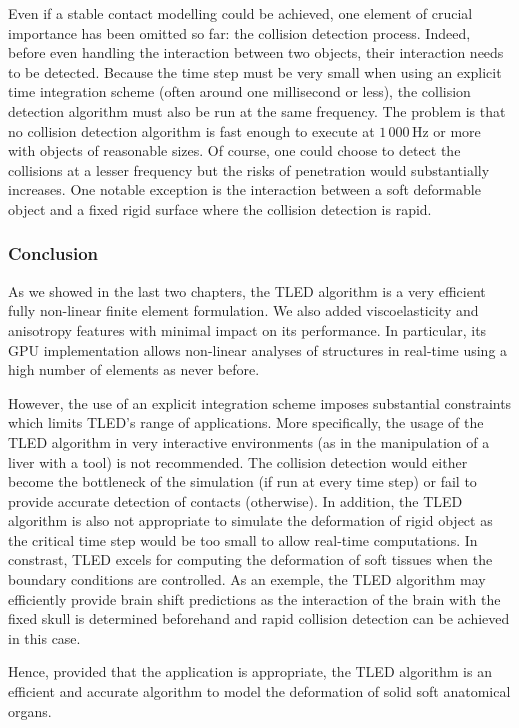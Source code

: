 \ON
Even if a stable contact modelling could be achieved, one element of crucial importance has been omitted so far: the collision detection process. Indeed, before even handling the interaction between two objects, their interaction needs to be detected. Because the time step must be very small when using an explicit time integration scheme (often around one millisecond or less), the collision detection algorithm must also be run at the same frequency. The problem is that no collision detection algorithm is fast enough to execute at $ 1\,000\,$Hz or more with objects of reasonable sizes. Of course, one could choose to detect the collisions at a lesser frequency but the risks of penetration would substantially increases. One notable exception is the interaction between a soft deformable object and a fixed rigid surface where the collision detection is rapid. 
\OFF
	

\ON
	\subsubsection{Conclusion}
As we showed in the last two chapters, the TLED algorithm is a very efficient fully non-linear finite element formulation. We also added viscoelasticity and anisotropy features with minimal impact on its performance. In particular, its GPU implementation allows non-linear analyses of structures in real-time using a high number of elements as never before. 

However, the use of an explicit integration scheme imposes substantial constraints which limits TLED's range of applications. More specifically, the usage of the TLED algorithm in very interactive environments (as in the manipulation of a liver with a tool) is not recommended. The collision detection would either become the bottleneck of the simulation (if run at every time step) or fail to provide accurate detection of contacts (otherwise). In addition, the TLED algorithm is also not appropriate to simulate the deformation of rigid object as the critical time step would be too small to allow real-time computations. In constrast, TLED excels for computing the deformation of soft tissues when the boundary conditions are controlled. As an exemple, the TLED algorithm may efficiently provide brain shift predictions as the interaction of the brain with the fixed skull is determined beforehand and rapid collision detection can be achieved in this case. 

Hence, provided that the application is appropriate, the TLED algorithm is an efficient and accurate algorithm to model the deformation of solid soft anatomical organs.
\OFF
